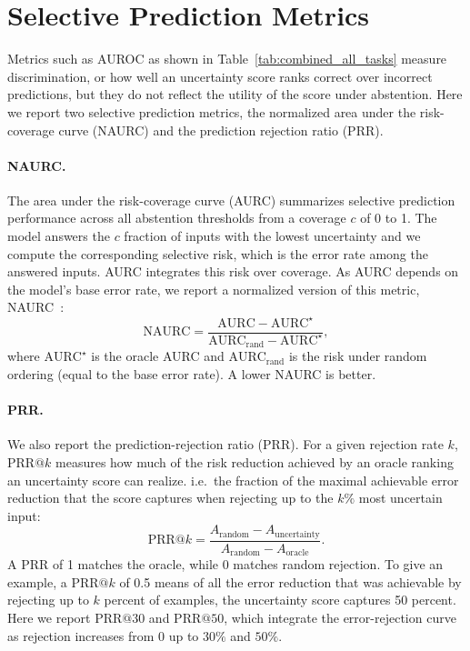\section{Selective Prediction Metrics}
\label{app:selection_pred_metrics}
Metrics such as AUROC as shown in Table~\ref{tab:combined_all_tasks} measure discrimination, or how well an uncertainty score ranks correct over incorrect predictions, but they do not reflect the utility of the score under abstention. Here we report two selective prediction metrics, the normalized area under the risk-coverage curve (NAURC) and the prediction rejection ratio (PRR).

\paragraph{NAURC.} The area under the risk-coverage curve (AURC) summarizes selective prediction performance across all abstention thresholds from a coverage $c$ of 0 to 1. The model answers the $c$ fraction of inputs with the lowest uncertainty and we compute the corresponding selective risk, which is the error rate among the answered inputs. AURC integrates this risk over coverage. As AURC depends on the model's base error rate, we report a normalized version of this metric, NAURC~\citep{cattelan2024fixbroken}:
$$\mathrm{NAURC} = \frac{\mathrm{AURC} - \mathrm{AURC}^{\star}}{\mathrm{AURC}_{\text{rand}} - \mathrm{AURC}^{\star}},$$
where $\text{AURC}^{\star}$ is the oracle AURC and $\text{AURC}_{\text{rand}}$ is the risk under random ordering (equal to the base error rate). A lower NAURC is better.

\paragraph{PRR.} We also report the prediction-rejection ratio (PRR). For a given rejection rate $k$, PRR$@k$ measures how much of the risk reduction achieved by an oracle ranking an uncertainty score can realize. i.e.\ the fraction of the maximal achievable error reduction that the score captures when rejecting up to the $k\%$ most uncertain input:
$$  \mathrm{PRR}@k =
  \frac{A_{\mathrm{random}} - A_{\mathrm{uncertainty}}}
       {A_{\mathrm{random}} - A_{\mathrm{oracle}}}.$$
A PRR of 1 matches the oracle, while 0 matches random rejection. To give an example, a PRR$@k$ of 0.5 means of all the error reduction that was achievable by rejecting up to $k$ percent of examples, the uncertainty score captures 50 percent. Here we report PRR$@30$ and PRR$@50$, which integrate the error-rejection curve as rejection increases from $0$ up to $30\%$ and $50\%$.


